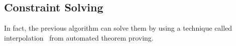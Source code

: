 


\subsection{Constraint Solving}
\label{sec:cs}

In fact, the previous algorithm can solve them 
by using a technique called 
interpolation~\cite{Henzinger2004,McMillan2005} from automated theorem 
proving.

